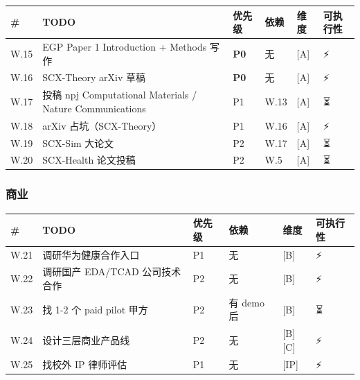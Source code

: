 \documentclass[
  12pt,
]{ctexart}
\begin{document}
\begin{longtable}[]{@{}
  >{\raggedright\arraybackslash}p{}
  >{\raggedright\arraybackslash}p{}
  >{\raggedright\arraybackslash}p{}
  >{\raggedright\arraybackslash}p{}
  >{\raggedright\arraybackslash}p{}
  >{\raggedright\arraybackslash}p{}@{}}
\toprule\noalign{}
\begin{minipage}[b]{\linewidth}\raggedright
\#
\end{minipage} & \begin{minipage}[b]{\linewidth}\raggedright
TODO
\end{minipage} & \begin{minipage}[b]{\linewidth}\raggedright
优先级
\end{minipage} & \begin{minipage}[b]{\linewidth}\raggedright
依赖
\end{minipage} & \begin{minipage}[b]{\linewidth}\raggedright
维度
\end{minipage} & \begin{minipage}[b]{\linewidth}\raggedright
可执行性
\end{minipage} \\
\midrule\noalign{}
\endhead
\bottomrule\noalign{}
\endlastfoot
W.15 & EGP Paper 1 Introduction + Methods 写作 & \textbf{P0} & 无 &
{[}A{]} & ⚡ \\
W.16 & SCX-Theory arXiv 草稿 & \textbf{P0} & 无 & {[}A{]} & ⚡ \\
W.17 & 投稿 npj Computational Materials / Nature Communications & P1 &
W.13 & {[}A{]} & ⏳ \\
W.18 & arXiv 占坑（SCX-Theory） & P1 & W.16 & {[}A{]} & ⚡ \\
W.19 & SCX-Sim 大论文 & P2 & W.17 & {[}A{]} & ⏳ \\
W.20 & SCX-Health 论文投稿 & P2 & W.5 & {[}A{]} & ⏳ \\
\end{longtable}

\subsubsection{商业}\label{ux5546ux4e1a}

\begin{longtable}[]{@{}llllll@{}}
\toprule\noalign{}
\# & TODO & 优先级 & 依赖 & 维度 & 可执行性 \\
\midrule\noalign{}
\endhead
\bottomrule\noalign{}
\endlastfoot
W.21 & 调研华为健康合作入口 & P1 & 无 & {[}B{]} & ⚡ \\
W.22 & 调研国产 EDA/TCAD 公司技术合作 & P2 & 无 & {[}B{]} & ⚡ \\
W.23 & 找 1-2 个 paid pilot 甲方 & P2 & 有 demo 后 & {[}B{]} & ⏳ \\
W.24 & 设计三层商业产品线 & P2 & 无 & {[}B{]}{[}C{]} & ⚡ \\
W.25 & 找校外 IP 律师评估 & P1 & 无 & {[}IP{]} & ⚡ \\
\end{longtable}
\end{document}
